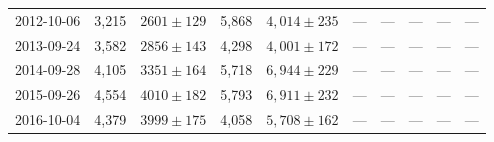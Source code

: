 \begin{landscape}
\begin{longtable}{cccccccccc}
{2012-10-06} & 3,215 & {$2601  \pm  129$} & 5,868 & {$4,014 \pm 235$} & --- & --- & --- & --- & --- \\
{2013-09-24} & 3,582 & {$2856  \pm  143$} & 4,298 & {$4,001 \pm 172$} & --- & --- & --- & --- & --- \\
{2014-09-28} & 4,105 & {$3351  \pm  164$} & 5,718 & {$6,944 \pm 229$} & --- & --- & --- & --- & --- \\
{2015-09-26} & 4,554 & {$4010  \pm  182$} & 5,793 & {$6,911 \pm 232$} & --- & --- & --- & --- & --- \\
{2016-10-04} & 4,379 & {$3999  \pm  175$} & 4,058 & {$5,708 \pm 162$} & --- & --- & --- & --- & --- \\
\end{longtable} 
\end{landscape} 
